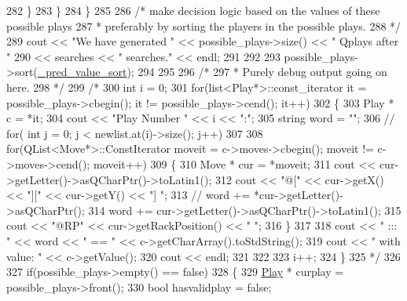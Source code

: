 \begin{DoxyCode}
282             \}
283         \}
284     \}
285 
286     \textcolor{comment}{/* make decision logic based on the values of these possible plays}
287 \textcolor{comment}{     * preferably by sorting the players in the possible plays.}
288 \textcolor{comment}{     */}
289     cout << \textcolor{stringliteral}{"We have generated "} << possible\_plays->size() << \textcolor{stringliteral}{" Qplays after "}
290          << searches << \textcolor{stringliteral}{" searches."} << endl;
291 
292 
293     possible\_plays->sort(\hyperlink{aiplayer_8cpp_a5ec041e0f53c78a5b4267c3df32ee188}{\_pred\_value\_sort});
294 
295 
296     \textcolor{comment}{/*}
297 \textcolor{comment}{     *  Purely debug output going on here.}
298 \textcolor{comment}{     */}
299     \textcolor{comment}{/*}
300 \textcolor{comment}{    int i = 0;}
301 \textcolor{comment}{    for(list<Play*>::const\_iterator it = possible\_plays->cbegin(); it != possible\_plays->cend(); it++)}
302 \textcolor{comment}{    \{}
303 \textcolor{comment}{        Play * c = *it;}
304 \textcolor{comment}{        cout << "Play Number " << i << ":";}
305 \textcolor{comment}{        string word = "";}
306 \textcolor{comment}{        // for( int j = 0; j < newlist.at(i)->size(); j++)}
307 \textcolor{comment}{}
308 \textcolor{comment}{        for(QList<Move*>::ConstIterator moveit = c->moves->cbegin(); moveit != c->moves->cend(); moveit++)}
309 \textcolor{comment}{        \{}
310 \textcolor{comment}{            Move * cur = *moveit;}
311 \textcolor{comment}{            cout << cur->getLetter()->asQCharPtr()->toLatin1();}
312 \textcolor{comment}{            cout << "@[" << cur->getX() << "][" << cur->getY() << "] ";}
313 \textcolor{comment}{            // word += *cur->getLetter()->asQCharPtr();}
314 \textcolor{comment}{            word += cur->getLetter()->asQCharPtr()->toLatin1();}
315 \textcolor{comment}{            cout << "@RP" << cur->getRackPosition() << "   ";}
316 \textcolor{comment}{        \}}
317 \textcolor{comment}{}
318 \textcolor{comment}{        cout << " ::: " << word << " == " << c->getCharArray().toStdString();}
319 \textcolor{comment}{        cout << " with value: " << c->getValue();}
320 \textcolor{comment}{        cout << endl;}
321 \textcolor{comment}{}
322 \textcolor{comment}{}
323 \textcolor{comment}{        i++;}
324 \textcolor{comment}{    \}}
325 \textcolor{comment}{    */}
326 
327     \textcolor{keywordflow}{if}(possible\_plays->empty() == \textcolor{keyword}{false})
328     \{
329         \hyperlink{class_play}{Play} * curplay = possible\_plays->front();
330         \textcolor{keywordtype}{bool} hasvalidplay = \textcolor{keyword}{false};

\end{DoxyCode}
